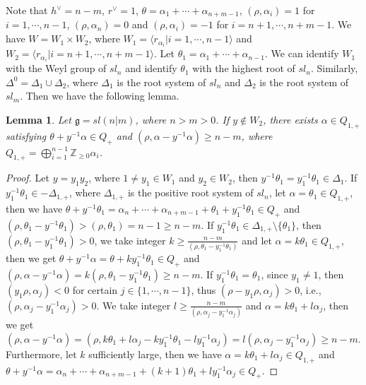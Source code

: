 \documentclass[12pt]{article}
\newtheorem{lem}[thm]{Lemma}
\begin{document}
Note that $h^{\vee}=n-m$, $r^\vee=1$, $\theta=\alpha_1+\cdots+\alpha_{n+m-1}$,
$(\rho, \alpha_i)=1$ for $i=1,\cdots,n-1$, $(\rho, \alpha_n)=0$ and $(\rho, \alpha_i)=-1$ for $i=n+1,\cdots,n+m-1$.
We have $W=W_1\times W_2$, where $W_1=\langle r_{\alpha_i}|i=1,\cdots,n-1\rangle$ and $W_2=\langle r_{\alpha_i}|i=n+1,\cdots,n+m-1\rangle$.
Let $\theta_1=\alpha_1+\cdots+\alpha_{n-1}$.
We can identify $W_1$ with the Weyl group of $sl_n$ and identify $\theta_1$ with the highest root of $sl_n$.
Similarly, $\Delta^0=\Delta_1\cup\Delta_2$, where $\Delta_1$ is the root system of $sl_n$ and $\Delta_2$ is the root system of $sl_m$.
Then we have the following lemma.
\begin{lem}\label{lemy3}
Let $\mathfrak{g}=sl(n|m)$, where $n>m>0$.
If $y\notin W_2$,
there exists $\alpha\in Q_{1,+}$ satisfying $\theta+y^{-1}\alpha\in Q_+$ and $(\rho,\alpha-y^{-1}\alpha)\geq n-m$,
where $Q_{1,+}=\bigoplus_{i=1}^{n-1}\mathbb{Z}_{\geq0}\alpha_i$.
\end{lem}
\begin{proof}
Let $y=y_1y_2$, where $1\ne y_1\in W_1$ and $y_2\in W_2$, then $y^{-1}\theta_1=y_1^{-1}\theta_1\in \Delta_1$.
If $y_1^{-1}\theta_1\in -\Delta_{1,+}$,
where $\Delta_{1,+}$ is the positive root system of $sl_n$,
let $\alpha=\theta_1\in Q_{1,+}$,
then we have $\theta+y^{-1}\theta_1=\alpha_n+\cdots+\alpha_{n+m-1}+\theta_1+y_1^{-1}\theta_1\in Q_+$ and
$(\rho,\theta_1-y^{-1}\theta_1)>(\rho,\theta_1)=n-1\geq n-m$.
If $y_1^{-1}\theta_1\in \Delta_{1,+}\setminus\{\theta_1\}$,
then $(\rho,\theta_1-y_1^{-1}\theta_1)>0$,
we take integer $k\geq\frac{n-m}{(\rho,\theta_1-y_1^{-1}\theta_1)}$ and let $\alpha=k\theta_1\in Q_{1,+}$,
then we get $\theta+y^{-1}\alpha=\theta+ky_1^{-1}\theta_1\in Q_+$ and
$(\rho,\alpha-y^{-1}\alpha)=k(\rho,\theta_1-y_1^{-1}\theta_1)\geq n-m$.
If $y_1^{-1}\theta_1=\theta_1$, since $y_1\ne1$, then $(y_1\rho, \alpha_j)<0$ for certain $j\in\{1,\cdots,n-1\}$,
thus $(\rho-y_1\rho, \alpha_j)>0$, i.e., $(\rho,\alpha_j-y_1^{-1}\alpha_j)>0$.
We take integer $l\geq\frac{n-m}{(\rho,\alpha_j-y_1^{-1}\alpha_j)}$ and $\alpha=k\theta_1+l\alpha_j$,
then we get $(\rho,\alpha-y^{-1}\alpha)=(\rho,k\theta_1+l\alpha_j-ky_1^{-1}\theta_1-ly_1^{-1}\alpha_j)=l(\rho,\alpha_j-y_1^{-1}\alpha_j)\geq n-m$.
Furthermore, let $k$ sufficiently large, then we have $\alpha=k\theta_1+l\alpha_j\in Q_{1,+}$ and
$\theta+y^{-1}\alpha=\alpha_n+\cdots+\alpha_{n+m-1}+(k+1)\theta_1+ly_1^{-1}\alpha_j\in Q_+$.
\end{proof}
\end{document}
